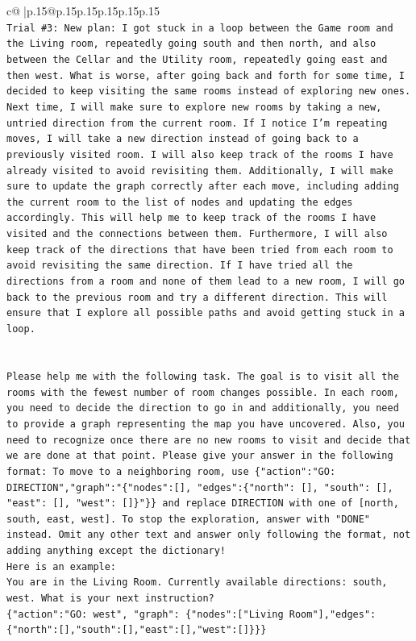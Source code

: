 \documentclass{article}
\begin{document}
{\begin{supertabular}{c@{$\;$}|p{.15\linewidth}@{}p{.15\linewidth}p{.15\linewidth}p{.15\linewidth}p{.15\linewidth}p{.15\linewidth}}
{{{\\ 
\texttt{Trial \#3: New plan: I got stuck in a loop between the Game room and the Living room, repeatedly going south and then north, and also between the Cellar and the Utility room, repeatedly going east and then west. What is worse, after going back and forth for some time, I decided to keep visiting the same rooms instead of exploring new ones. Next time, I will make sure to explore new rooms by taking a new, untried direction from the current room. If I notice I'm repeating moves, I will take a new direction instead of going back to a previously visited room. I will also keep track of the rooms I have already visited to avoid revisiting them. Additionally, I will make sure to update the graph correctly after each move, including adding the current room to the list of nodes and updating the edges accordingly. This will help me to keep track of the rooms I have visited and the connections between them. Furthermore, I will also keep track of the directions that have been tried from each room to avoid revisiting the same direction. If I have tried all the directions from a room and none of them lead to a new room, I will go back to the previous room and try a different direction. This will ensure that I explore all possible paths and avoid getting stuck in a loop.} \\
\\ 
\\ 
\texttt{Please help me with the following task. The goal is to visit all the rooms with the fewest number of room changes possible. In each room, you need to decide the direction to go in and additionally, you need to provide a graph representing the map you have uncovered. Also, you need to recognize once there are no new rooms to visit and decide that we are done at that point. Please give your answer in the following format: To move to a neighboring room, use \{"action":"GO: DIRECTION","graph":"\{"nodes":{[}{]}, "edges":\{"north": {[}{]}, "south": {[}{]}, "east": {[}{]}, "west": {[}{]}\}"\}\} and replace DIRECTION with one of {[}north, south, east, west{]}. To stop the exploration, answer with "DONE" instead. Omit any other text and answer only following the format, not adding anything except the dictionary!} \\
\texttt{Here is an example: } \\
\texttt{You are in the Living Room. Currently available directions: south, west. What is your next instruction?} \\
\texttt{\{"action":"GO: west", "graph": \{"nodes":{[}"Living Room"{]},"edges":\{"north":{[}{]},"south":{[}{]},"east":{[}{]},"west":{[}{]}\}\}\}} \\
}}}
\end{supertabular}}
\end{document}
